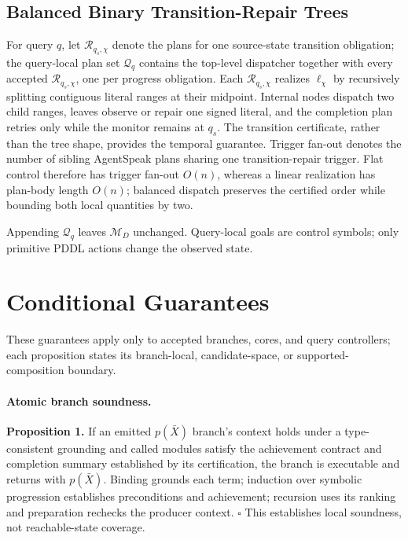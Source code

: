 \subsection{Balanced Binary Transition-Repair Trees}
\label{sec:balanced-trees}

For query $q$, let $\mathcal R_{q_s,\chi}$ denote the plans for one source-state
transition obligation; the query-local plan set $\mathcal Q_q$ contains the
top-level dispatcher together with every accepted $\mathcal R_{q_s,\chi}$, one
per progress obligation. Each $\mathcal R_{q_s,\chi}$ realizes
$\boldsymbol\ell_\chi$ by recursively splitting contiguous literal ranges at
their midpoint. Internal nodes dispatch two child ranges, leaves observe or
repair one signed literal, and the completion plan retries only while the
monitor remains at $q_s$. The transition certificate, rather than the tree
shape, provides the temporal guarantee. Trigger fan-out denotes the number of sibling
AgentSpeak plans sharing one transition-repair trigger. Flat control therefore
has trigger fan-out $O(n)$, whereas a linear realization has plan-body length
$O(n)$; balanced dispatch preserves the certified order while bounding both
local quantities by two.

Appending $\mathcal Q_q$ leaves $\mathcal M_D$ unchanged. Query-local goals are
control symbols; only primitive PDDL actions change the observed state.

\section{Conditional Guarantees}
\label{sec:guarantees}

These guarantees apply only to accepted branches, cores, and query controllers;
each proposition states its branch-local, candidate-space, or
supported-composition boundary.

\paragraph{Atomic branch soundness.}
\textbf{Proposition 1.} If an emitted $p(\bar X)$ branch's context holds under a
type-consistent grounding and called modules satisfy the achievement
contract and completion summary established by its certification, the branch
is executable and returns with $p(\bar X)$. Binding grounds each term; induction
over symbolic progression establishes preconditions and achievement;
recursion uses its ranking and preparation rechecks the producer context.
\hfill$\square$ This establishes local soundness, not
reachable-state coverage.

